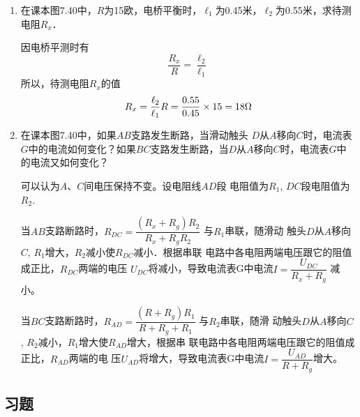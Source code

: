 \begin{enumerate}
\begin{solution}
    \end{solution}
    
    \item 在课本图7.40中，$R$为15欧，电桥平衡时，$\ell_1$为0.45米，$\ell_2$为0.55米，求待测电阻$R_x$．

    \begin{solution}
        因电桥平测时有
\[\frac{R_x}{R}=\frac{\ell_2}{\ell_1}\]
        所以，待测电阻$R_x$的值
\[R_x=\frac{\ell_2}{\ell_1}R=\frac{0.55}{0.45}\times 15=18\Omega\]
    \end{solution}
    
    \item 在课本图7.40中，如果$AB$支路发生断路，当滑动触头
    $D$从$A$移向$C$时，电流表$G$中的电流如何变化？如果$BC$支路发生断路，当$D$从$A$移向$C$时，电流表$G$中的电流又如何变化？

    \begin{solution}
        可以认为$A$、$C$间电压保持不变。设电阻线$AD$段
        电阻值为$R_1$, $DC$段电阻值为$R_2$.

        当$AB$支路断路时，$R_{DC}=\dfrac{(R_x+R_g)R_2}{R_x+R_gR_2}$
        与$R_1$串联，随滑动
        触头$D$从$A$移向$C$, $R_1$增大，$R_2$减小使$R_{DC}$减小．根据串联
        电路中各电阻两端电压跟它的阻值成正比，$R_{DC}$两端的电压
$U_{DC}$将减小，导致电流表G中电流$I=\dfrac{U_{DC}}{R_x+R_g}$
减小。

当$BC$支路断路时，$R_{AD}=\dfrac{(R+R_g)R_1}{R+R_g+R_1}$
与$R_2$串联，随滑
动触头$D$从$A$移向$C$, $R_2$减小，$R_1$增大使$R_{AD}$增大，根据串
联电路中各电阻两端电压跟它的阻值成正比，$R_{AD}$两端的电
压$U_{AD}$将增大，导致电流表G中电流$I=\dfrac{U_{AD}}{R+R_g}$增大。
    \end{solution}
    
\end{enumerate}






\subsection{习题}

